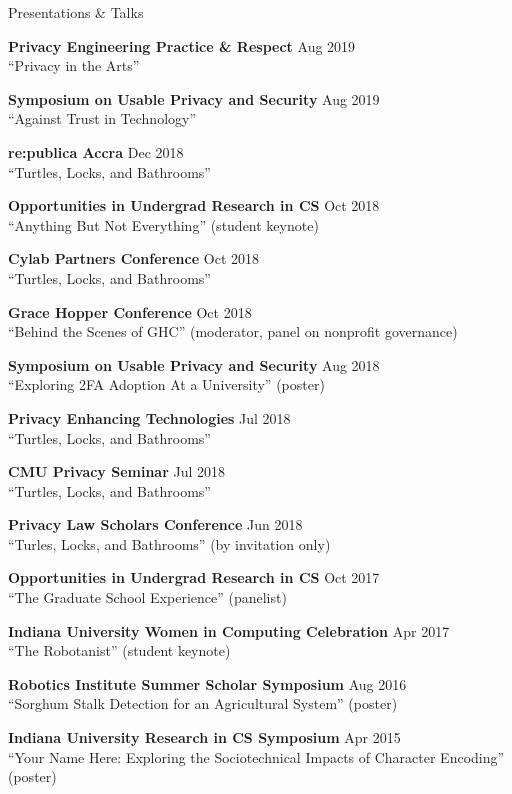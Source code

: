 \documentclass{resume} %
\begin{document}
\begin{rSection}{Presentations \& Talks}
	
	{\bf Privacy Engineering Practice \& Respect} \hfill Aug 2019 \\
		``Privacy in the Arts'' 
		
	{\bf Symposium on Usable Privacy and Security} \hfill Aug 2019 \\
		``Against Trust in Technology'' 
	
	{\bf re:publica Accra} \hfill Dec 2018 \\
		``Turtles, Locks, and Bathrooms'' 

	{\bf Opportunities in Undergrad Research in CS} \hfill Oct 2018 \\ 
		``Anything But Not Everything'' (student keynote)

	{\bf Cylab Partners Conference}  \hfill Oct 2018 \\ 
		``Turtles, Locks, and Bathrooms''

	{\bf Grace Hopper Conference} \hfill Oct 2018 \\ 
		``Behind the Scenes of GHC'' (moderator, panel on nonprofit governance)

	{\bf Symposium on Usable Privacy and Security} \hfill Aug 2018 \\ 
		``Exploring 2FA Adoption At a University'' (poster) 

	{\bf Privacy Enhancing Technologies} \hfill Jul 2018 \\ 
		``Turtles, Locks, and Bathrooms'' 

	{\bf CMU Privacy Seminar}  \hfill Jul 2018 \\ 
		``Turtles, Locks, and Bathrooms''

	{\bf Privacy Law Scholars Conference} \hfill Jun 2018 \\ 
		``Turles, Locks, and Bathrooms'' (by invitation only) 

	{\bf Opportunities in Undergrad Research in CS} \hfill Oct 2017 \\ 
		``The Graduate School Experience'' (panelist) \

	{\bf Indiana University Women in Computing Celebration} \hfill Apr 2017 \\ 
		``The Robotanist'' (student keynote) 

	{\bf Robotics Institute Summer Scholar Symposium} \hfill Aug 2016 \\ 
		``Sorghum Stalk Detection for an Agricultural System'' (poster) 

	{\bf Indiana University Research in CS Symposium} \hfill Apr 2015 \\
		``Your Name Here: Exploring the Sociotechnical Impacts of Character Encoding'' (poster)  

\end{rSection}
\end{document}

